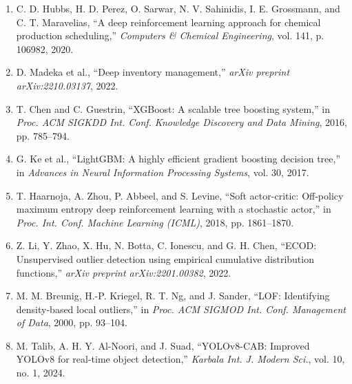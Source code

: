\documentclass[12pt,a4paper,oneside]{report}
\begin{document}
\begin{enumerate}
  pp. 198--206, 2013.
\item
  C. D. Hubbs, H. D. Perez, O. Sarwar, N. V. Sahinidis, I. E. Grossmann,
  and C. T. Maravelias, ``A deep reinforcement learning approach for
  chemical production scheduling,'' \emph{Computers \& Chemical
  Engineering}, vol. 141, p. 106982, 2020.
\item
  D. Madeka et al., ``Deep inventory management,'' \emph{arXiv preprint
  arXiv:2210.03137}, 2022.
\item
  T. Chen and C. Guestrin, ``XGBoost: A scalable tree boosting system,''
  in \emph{Proc. ACM SIGKDD Int. Conf. Knowledge Discovery and Data
  Mining}, 2016, pp. 785--794.
\item
  G. Ke et al., ``LightGBM: A highly efficient gradient boosting
  decision tree,'' in \emph{Advances in Neural Information Processing
  Systems}, vol. 30, 2017.

\item
  T. Haarnoja, A. Zhou, P. Abbeel, and S. Levine, ``Soft actor-critic: Off-policy maximum entropy deep reinforcement learning with a stochastic actor,'' in \emph{Proc. Int. Conf. Machine Learning (ICML)}, 2018, pp. 1861--1870.

\item
  Z. Li, Y. Zhao, X. Hu, N. Botta, C. Ionescu, and G. H. Chen, ``ECOD: Unsupervised outlier detection using empirical cumulative distribution functions,'' \emph{arXiv preprint arXiv:2201.00382}, 2022.

\item
  M. M. Breunig, H.-P. Kriegel, R. T. Ng, and J. Sander, ``LOF: Identifying density-based local outliers,'' in \emph{Proc. ACM SIGMOD Int. Conf. Management of Data}, 2000, pp. 93--104.

\item
  M. Talib, A. H. Y. Al-Noori, and J. Suad, ``YOLOv8-CAB: Improved YOLOv8 for real-time object detection,'' \emph{Karbala Int. J. Modern Sci.}, vol. 10, no. 1, 2024.


\end{enumerate}
\end{document}
